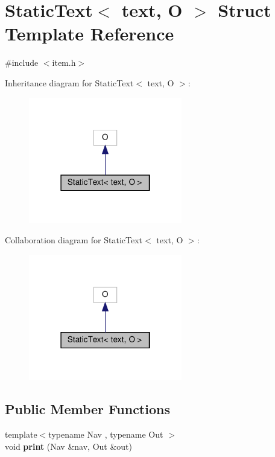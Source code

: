 \hypertarget{structStaticText}{}\section{Static\+Text$<$ text, O $>$ Struct Template Reference}
\label{structStaticText}


{\ttfamily \#include $<$item.\+h$>$}



Inheritance diagram for Static\+Text$<$ text, O $>$\+:\nopagebreak
\begin{figure}[H]
\begin{center}
\leavevmode
\includegraphics[width=190pt]{structStaticText__inherit__graph}
\end{center}
\end{figure}


Collaboration diagram for Static\+Text$<$ text, O $>$\+:\nopagebreak
\begin{figure}[H]
\begin{center}
\leavevmode
\includegraphics[width=190pt]{structStaticText__coll__graph}
\end{center}
\end{figure}
\subsection*{Public Member Functions}
\begin{DoxyCompactItemize}
\item 
\mbox{\label{structStaticText_ab7cec399ef6a49ccbde2cb8604117543}} 
{\footnotesize template$<$typename Nav , typename Out $>$ }\\void {\bfseries print} (Nav \&nav, Out \&out)
\end{DoxyCompactItemize}


